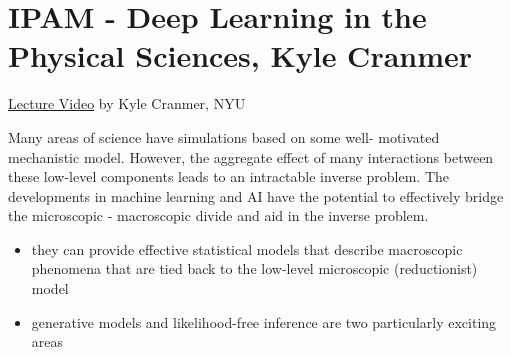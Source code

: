\documentclass{article}
\begin{document}

\section{IPAM - Deep Learning in the Physical Sciences, Kyle Cranmer}

\href{http://www.ipam.ucla.edu/abstract/?tid=14649&pcode=DLT2018}{Lecture Video} by Kyle Cranmer, NYU

Many areas of science have simulations based on some well- motivated mechanistic model. However, the aggregate effect of many interactions between these low-level components leads to an intractable inverse problem. The developments in machine learning and AI have the potential to effectively bridge the microscopic - macroscopic divide and aid in the inverse problem.
\begin{itemize}
   \item they can provide effective statistical models that describe macroscopic phenomena that are tied back to the low-level microscopic (reductionist) model
   \item generative models and likelihood-free inference are two particularly exciting areas
\end{itemize}
\end{document}

